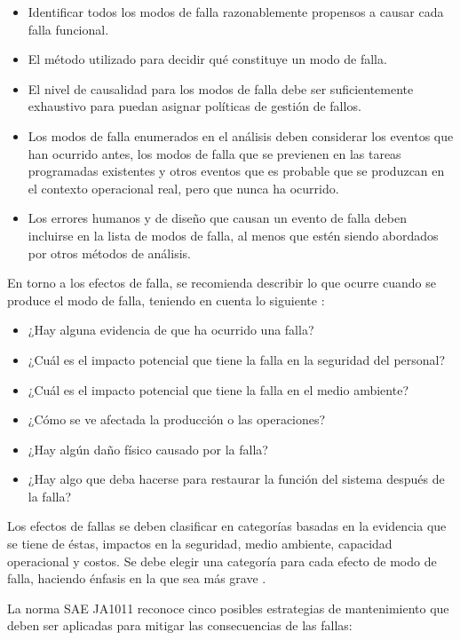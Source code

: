 \begin{itemize}
\item Identificar todos los modos de falla razonablemente propensos a causar cada falla funcional.
\item El método utilizado para decidir qué constituye un modo de falla.
\item El nivel de causalidad para los modos de falla debe ser suficientemente exhaustivo para puedan asignar políticas de gestión de fallos.
\item Los modos de falla enumerados en el análisis deben considerar los eventos que han ocurrido antes, los modos de falla que se previenen en las tareas programadas existentes y otros eventos que es probable que se produzcan en el contexto operacional real, pero que nunca ha ocurrido.
\item Los errores humanos y de diseño que causan un evento de falla deben incluirse en la lista de modos de falla, al menos que estén siendo abordados por otros métodos de análisis.

\end{itemize}

En torno a los efectos de falla, se recomienda describir lo que ocurre cuando se produce el modo de falla, teniendo en cuenta lo siguiente \citep{saeja1011}:\\

\begin{itemize}
\item ¿Hay alguna evidencia de que ha ocurrido una falla?
\item ¿Cuál es el impacto potencial que tiene la falla en la seguridad del personal?
\item ¿Cuál es el impacto potencial que tiene la falla en el medio ambiente?
\item ¿Cómo se ve afectada la producción o las operaciones?
\item ¿Hay algún daño físico causado por la falla?
\item ¿Hay algo que deba hacerse para restaurar la función del sistema después de la falla? 
\end{itemize}

Los efectos de fallas se deben clasificar en categorías basadas en la evidencia que se tiene de éstas, impactos en la seguridad, medio ambiente, capacidad operacional y costos. Se debe elegir una categoría para cada efecto de modo de falla, haciendo énfasis en la que sea más grave \citep{sifonte2017}.

La norma SAE JA1011 reconoce cinco posibles estrategias de mantenimiento que deben ser aplicadas para mitigar las consecuencias de las fallas\citep{sifonte2017}:\\

